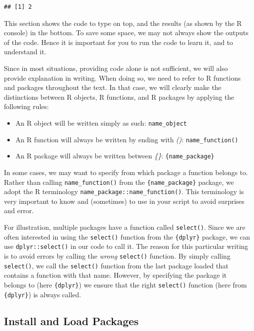 \documentclass[
]{krantz}
\providecommand{\tightlist}{%
  \setlength{\itemsep}{0pt}\setlength{\parskip}{0pt}}
\begin{document}
\begin{verbatim}
## [1] 2
\end{verbatim}

This section shows the code to type on top, and the results (as shown by the R console) in the bottom. To save some space, we may not always show the outputs of the code. Hence it is important for you to run the code to learn it, and to understand it.

Since in most situations, providing code alone is not sufficient, we will also provide explanation in writing. When doing so, we need to refer to R functions and packages throughout the text. In that case, we will clearly make the distinctions between R objects, R functions, and R packages by applying the following rules:

\begin{itemize}
\tightlist
\item
  An R object will be written simply as such: \texttt{name\_object}
\item
  An R function will always be written by ending with \emph{()}: \texttt{name\_function()}
\item
  An R package will always be written between \emph{\{\}}: \texttt{\{name\_package\}}
\end{itemize}

In some cases, we may want to specify from which package a function belongs to. Rather than calling \texttt{name\_function()} from the \texttt{\{name\_package\}} package, we adopt the R terminology \texttt{name\_package::name\_function()}. This terminology is very important to know and (sometimes) to use in your script to avoid surprises and error.

For illustration, multiple packages have a function called \texttt{select()}. Since we are often interested in using the \texttt{select()} function from the \texttt{\{dplyr\}} package, we can use \texttt{dplyr::select()} in our code to call it. The reason for this particular writing is to avoid errors by calling the \emph{wrong} \texttt{select()} function. By simply calling \texttt{select()}, we call the \texttt{select()} function from the last package loaded that contains a function with that name. However, by specifying the package it belongs to (here \texttt{\{dplyr\}}) we ensure that the right \texttt{select()} function (here from \texttt{\{dplyr\}}) is always called.

\hypertarget{install-and-load-packages}{%
\subsection{Install and Load Packages}\label{install-and-load-packages}}
\end{document}

